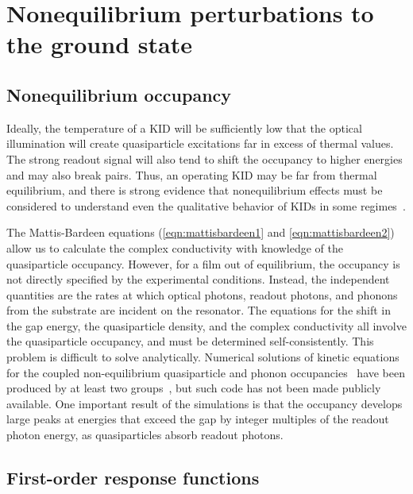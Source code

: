 \section{Nonequilibrium perturbations to the ground state}
\label{sec:theory.perturbation}

\subsection{Nonequilibrium occupancy}
\label{sec:theory.perturbation.nonequilibrium}

Ideally, the temperature of a KID will be sufficiently low that the optical illumination will create quasiparticle excitations far in excess of thermal values.
The strong readout signal will also tend to shift the occupancy to higher energies and may also break pairs.
Thus, an operating KID may be far from thermal equilibrium, and there is strong evidence that nonequilibrium effects must be considered to understand even the qualitative behavior of KIDs in some regimes~\autocite{deVisser2014PRL,Budoyo2016PRB}.

The Mattis-Bardeen equations (\ref{eqn:mattisbardeen1} and \ref{eqn:mattisbardeen2}) allow us to calculate the complex conductivity with knowledge of the quasiparticle occupancy.
However, for a film out of equilibrium, the occupancy is not directly specified by the experimental conditions.
Instead, the independent quantities are the rates at which optical photons, readout photons, and phonons from the substrate are incident on the resonator.
The equations for the shift in the gap energy, the quasiparticle density, and the complex conductivity all involve the quasiparticle occupancy, and must be determined self-consistently.
This problem is difficult to solve analytically.
Numerical solutions of kinetic equations for the coupled non-equilibrium quasiparticle and phonon occupancies~\autocite{Chang1977PRB, Chang1978JLTP}
have been produced by at least two groups~\autocite{Goldie2013SUST, Budoyo2016PRB}, but such code has not been made publicly available.
One important result of the simulations is that the occupancy develops large peaks at energies that exceed the gap by integer multiples of the readout photon energy, as quasiparticles absorb readout photons.


\subsection{First-order response functions}
\label{sec:theory.perturbation.first-order}

